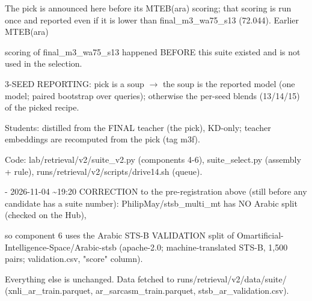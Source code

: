 {The pick is announced here before its MTEB(ara) scoring; that scoring is run once and reported even if it is lower than final\_m3\_wa75\_s13 (72.044). Earlier MTEB(ara)

scoring of final\_m3\_wa75\_s13 happened BEFORE this suite existed and is not used in the selection.

3-SEED REPORTING: pick is a soup $\to$ the soup is the reported model (one model; paired bootstrap over queries); otherwise the per-seed blends (13/14/15) of the picked recipe.

Students: distilled from the FINAL teacher (the pick), KD-only; teacher embeddings are recomputed from the pick (tag m3f).

Code: lab/retrieval/v2/suite\_v2.py (components 4-6), suite\_select.py (assembly + rule), runs/retrieval/v2/scripts/drive14.sh (queue).

- 2026-11-04 \textasciitilde{}19:20 CORRECTION to the pre-registration above (still before any candidate has a suite number): PhilipMay/stsb\_multi\_mt has NO Arabic split (checked on the Hub),

so component 6 uses the Arabic STS-B VALIDATION split of Omartificial-Intelligence-Space/Arabic-stsb (apache-2.0; machine-translated STS-B, 1,500 pairs; validation.csv, "score" column).

Everything else is unchanged. Data fetched to runs/retrieval/v2/data/suite/ (xnli\_ar\_train.parquet, ar\_sarcasm\_train.parquet, stsb\_ar\_validation.csv).\par}

